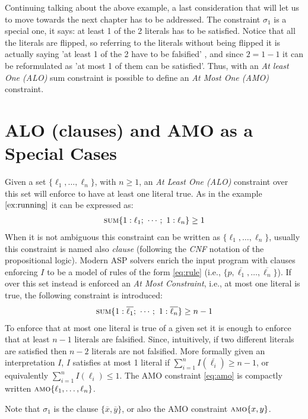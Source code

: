 Continuing talking about the above example, a last consideration that will let us to move towards the next 
chapter has to be addressed.
The constraint $\sigma_1$ is a special one, it says: at least 1 of the 2 literals
has to be satisfied. Notice that all the literals are flipped, 
so referring to the literals without being flipped it is 
actually saying 'at least 1 of the 2 have to be falsified' , and since $2 = 1 - 1$ it can be 
reformulated as 'at most 1 of them can be satisfied'.
Thus, with an \textit{At least One (ALO)} sum constraint is possible to define an \textit{At Most One (AMO)}
constraint.

\section{ALO (clauses) and AMO as a Special Cases}
\label{sec:bg-clauses_AMO}

Given a set $\{\ell_1, \hdots, \ell_n\}$, with $n \ge 1$, an \textit{At Least One (ALO)} 
constraint over this set will enforce to have at least one literal true.
As in the example $\ref{ex:running}$ it can be expressed as:
\begin{align}\label{eq:ALO}
    \textsc{sum}\{1 : \ell_1;\ \cdots;\ 1 : \ell_n\} \geq 1
\end{align}
When it is not ambiguous this constraint can be written as $\{\ell_1, \hdots, \ell_n\}$,
usually this constraint is named also \textit{clause} (following the \textit{CNF} notation 
of the propositional logic).
Modern ASP solvers enrich the input program with clauses enforcing $I$ to be a 
model of rules of the form \eqref{eq:rule} (i.e., $\{p, \overline{\ell_1}, \ldots, \overline{\ell_n}\}$).
If over this set instead is enforced an \textit{At Most Constraint}, i.e., at most 
one literal is true, the following constraint is introduced:
\begin{align}\label{eq:amo}
    \textsc{sum}\{1 : \overline{\ell_1};\ \cdots;\ 1 : \overline{\ell_n}\} \geq n - 1
\end{align}
To enforce that at most
one literal is true of a given set it is enough to enforce that 
at least $n-1$ literals are falsified.
Since, intuitively, if two different literals are satisfied then $n-2$ literals are not falsified.
More formally given an interpretation $I$, $I$ satisfies at most 1 literal if 
$\sum_{i = 1}^{n}{I(\overline{\ell_i})} \geq n - 1$, or equivalently
$\sum_{i = 1}^{n}{I(\ell_i)} \leq 1$.
The AMO constraint \eqref{eq:amo} is compactly written $\textsc{amo}\{\ell_1,\ldots,\ell_n\}$.
\begin{example}
    Note that $\sigma_1$ is the clause $\{\overline{x}, \overline{y}\}$, or also the AMO constraint $\textsc{amo}\{x, y\}$.
\end{example}
